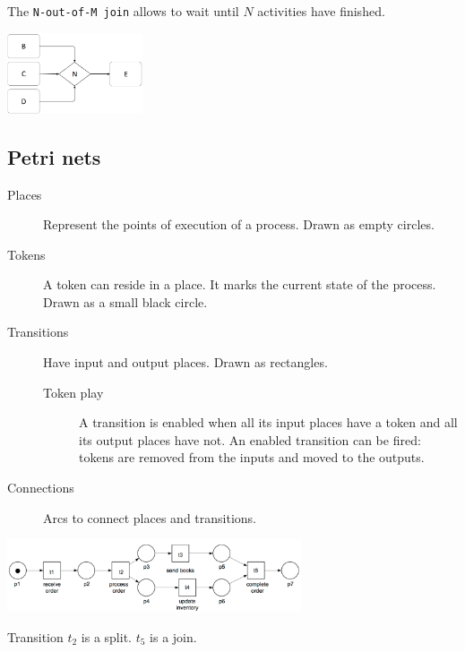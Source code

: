 \begin{description}
        \begin{example}
            The \texttt{N-out-of-M join} allows to wait until $N$ activities have finished.
            \begin{center}
                \includegraphics[width=0.3\textwidth]{img/bp_control_flow_n_out_of_m_join.png}
            \end{center}
        \end{example}
\end{description}



\subsection{Petri nets}

\begin{description}
    \item[Places] 
        Represent the points of execution of a process.
        Drawn as empty circles.

    \item[Tokens] 
        A token can reside in a place.
        It marks the current state of the process.
        Drawn as a small black circle.
    
    \item[Transitions] 
        Have input and output places.
        Drawn as rectangles.

        \begin{description}
            \item[Token play]
                A transition is enabled when all its input places have a token and all its output places have not.
                An enabled transition can be fired: tokens are removed from the inputs and moved to the outputs.
        \end{description}

    \item[Connections] 
        Arcs to connect places and transitions.
\end{description}

\begin{example} \phantom{}
    \begin{center}
        \includegraphics[width=0.65\textwidth]{img/petri_net_example1.png}
    \end{center}
    Transition $t_2$ is a split. $t_5$ is a join.
\end{example}

